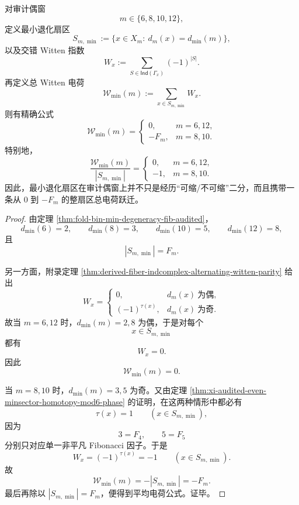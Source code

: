\begin{theorem}\label{thm:xi-time-part64ba-audited-even-minsector-total-witten-charge}
对审计偶窗
\[
m\in\{6,8,10,12\},
\]
定义最小退化扇区
\[
S_{m,\min}:=\{x\in X_m:\ d_m(x)=d_{\min}(m)\},
\]
以及交错 Witten 指数
\[
W_x:=\sum_{S\in \mathsf{Ind}(\Gamma_x)}(-1)^{|S|}.
\]
再定义总 Witten 电荷
\[
\mathcal W_{\min}(m):=\sum_{x\in S_{m,\min}}W_x.
\]
则有精确公式
\[
\boxed{\;
\mathcal W_{\min}(m)=
\begin{cases}
0,& m=6,12,\\[1mm]
-F_m,& m=8,10.
\end{cases}\;}
\]
特别地，
\[
\boxed{\;
\frac{\mathcal W_{\min}(m)}{|S_{m,\min}|}=
\begin{cases}
0,& m=6,12,\\[1mm]
-1,& m=8,10.
\end{cases}\;}
\]
因此，最小退化扇区在审计偶窗上并不只是经历“可缩/不可缩”二分，而且携带一条从 \(0\) 到 \(-F_m\) 的整扇区总电荷跃迁。
\end{theorem}
\begin{proof}
由定理 \ref{thm:fold-bin-min-degeneracy-fib-audited}，
\[
d_{\min}(6)=2,\qquad d_{\min}(8)=3,\qquad d_{\min}(10)=5,\qquad d_{\min}(12)=8,
\]
且
\[
|S_{m,\min}|=F_m.
\]

另一方面，附录定理 \ref{thm:derived-fiber-indcomplex-alternating-witten-parity} 给出
\[
W_x=
\begin{cases}
0,& d_m(x)\ \text{为偶},\\[1mm]
(-1)^{\tau(x)},& d_m(x)\ \text{为奇}.
\end{cases}
\]
故当 \(m=6,12\) 时，\(d_{\min}(m)=2,8\) 为偶，于是对每个
\[
x\in S_{m,\min}
\]
都有
\[
W_x=0.
\]
因此
\[
\mathcal W_{\min}(m)=0.
\]

当 \(m=8,10\) 时，\(d_{\min}(m)=3,5\) 为奇。又由定理 \ref{thm:xi-audited-even-minsector-homotopy-mod6-phase} 的证明，在这两种情形中都必有
\[
\tau(x)=1
\qquad (x\in S_{m,\min}),
\]
因为
\[
3=F_4,\qquad 5=F_5
\]
分别只对应单一非平凡 Fibonacci 因子。于是
\[
W_x=(-1)^{\tau(x)}=-1
\qquad (x\in S_{m,\min}).
\]
故
\[
\mathcal W_{\min}(m)= -|S_{m,\min}|=-F_m.
\]
最后再除以 \(|S_{m,\min}|=F_m\)，便得到平均电荷公式。证毕。
\end{proof}

